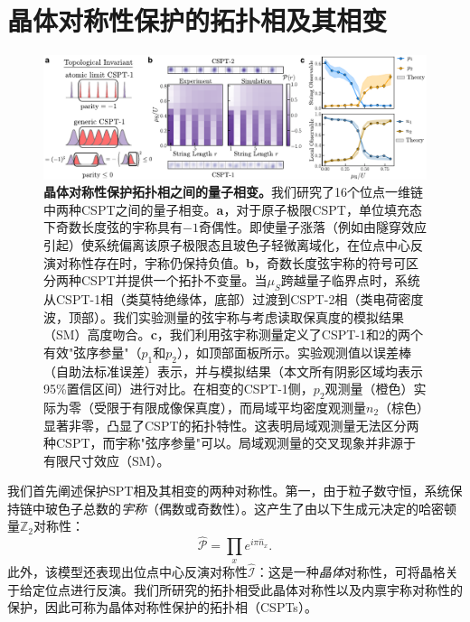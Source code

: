 \documentclass[preprint,superscriptaddress,floatfix, nofootinbib]{revtex4-2}
\begin{document}
\section{晶体对称性保护的拓扑相及其相变} \label{sec:CSPT-transitions}
\begin{figure}
    \centering
    \includegraphics[width=\textwidth]{figures/Fig_CSPT_ground.pdf}
    \caption{\textbf{晶体对称性保护拓扑相之间的量子相变。}我们研究了16个位点一维链中两种CSPT之间的量子相变。\textbf{a}，对于原子极限CSPT，单位填充态下奇数长度弦的宇称具有$-1$奇偶性。即使量子涨落（例如由隧穿效应引起）使系统偏离该原子极限态且玻色子轻微离域化，在位点中心反演对称性存在时，宇称仍保持负值。\textbf{b}，奇数长度弦宇称的符号可区分两种CSPT并提供一个拓扑不变量。当$\mu_S$跨越量子临界点时，系统从CSPT-1相（类莫特绝缘体，底部）过渡到CSPT-2相（类电荷密度波，顶部）。我们实验测量的弦宇称与考虑读取保真度的模拟结果（SM）高度吻合。\textbf{c}，我们利用弦宇称测量定义了CSPT-1和2的两个有效"弦序参量"（$p_1$和$p_2$），如顶部面板所示。实验观测值以误差棒（自助法标准误差）表示，并与模拟结果（本文所有阴影区域均表示95\%置信区间）进行对比。在相变的CSPT-1侧，$p_2$观测量（橙色）实际为零（受限于有限成像保真度），而局域平均密度观测量$n_2$（棕色）显著非零，凸显了CSPT的拓扑特性。这表明局域观测量无法区分两种CSPT，而宇称"弦序参量"可以。局域观测量的交叉现象并非源于有限尺寸效应（SM）。}
    \label{fig: CSPT_ground}
\end{figure}
我们首先阐述保护SPT相及其相变的两种对称性。第一，由于粒子数守恒，系统保持链中玻色子总数的\textit{宇称}（偶数或奇数性）。这产生了由以下生成元决定的哈密顿量$\mathbb{Z}_2$对称性：
\begin{equation} \label{eq: parity-generator}
 \hat{\mathcal{P}} = \prod_{x} e^{i \pi \hat{n}_x}   .
\end{equation}
此外，该模型还表现出位点中心反演对称性$\hat{\mathcal I}$：这是一种\textit{晶体}对称性，可将晶格关于给定位点进行反演。我们所研究的拓扑相受此晶体对称性以及内禀宇称对称性的保护，因此可称为晶体对称性保护的拓扑相（CSPTs）\cite{Fu11, Turner10inversion, Hughes11, Fuji2015, Song17}。
\end{document}
